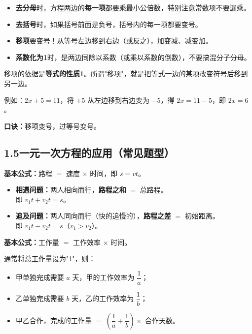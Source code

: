 \documentclass[12pt, a4paper]{ctexart}
\begin{document}
\begin{warnbox}[解方程中的易错点]
\begin{itemize}[nosep]
  \item \textbf{去分母}时，方程两边的\textbf{每一项}都要乘最小公倍数，特别注意常数项不要漏乘。
  \item \textbf{去括号}时，如果括号前面是负号，括号内的每一项都要变号。
  \item \textbf{移项}要变号！从等号左边移到右边（或反之），加变减、减变加。
  \item \textbf{系数化为1}时，是两边同除以系数（或乘以系数的倒数），不要搞混分子分母。
\end{itemize}
\end{warnbox}

\begin{tipbox}[移项的本质]
移项的依据是\textbf{等式的性质1}。所谓"移项"，就是把等式一边的某项改变符号后移到另一边。

例如：$2x+5=11$，将 $+5$ 从左边移到右边变为 $-5$，得 $2x=11-5$，即 $2x=6$。

\textbf{口诀：}移项变号，过等号变号。
\end{tipbox}

\subsection*{1.5\quad 一元一次方程的应用（常见题型）}

\begin{knowledgebox}[行程问题]
\textbf{基本公式：}路程 $=$ 速度 $\times$ 时间，即 $s=vt$。

\begin{itemize}[nosep]
  \item \textbf{相遇问题：}两人相向而行，\textbf{路程之和} $=$ 总路程。\\
    即 $v_1 t + v_2 t = s$。
  \item \textbf{追及问题：}两人同向而行（快的追慢的），\textbf{路程之差} $=$ 初始距离。\\
    即 $v_1 t - v_2 t = s$（$v_1>v_2$）。
\end{itemize}
\end{knowledgebox}

\begin{knowledgebox}[工程问题]
\textbf{基本公式：}工作量 $=$ 工作效率 $\times$ 时间。

通常将总工作量设为"1"，则：
\begin{itemize}[nosep]
  \item 甲单独完成需要 $a$ 天，甲的工作效率为 $\dfrac{1}{a}$；
  \item 乙单独完成需要 $b$ 天，乙的工作效率为 $\dfrac{1}{b}$；
  \item 甲乙合作，完成的工作量 $=$ $\left(\dfrac{1}{a}+\dfrac{1}{b}\right)\times$ 合作天数。
\end{itemize}
\end{knowledgebox}
\end{document}
